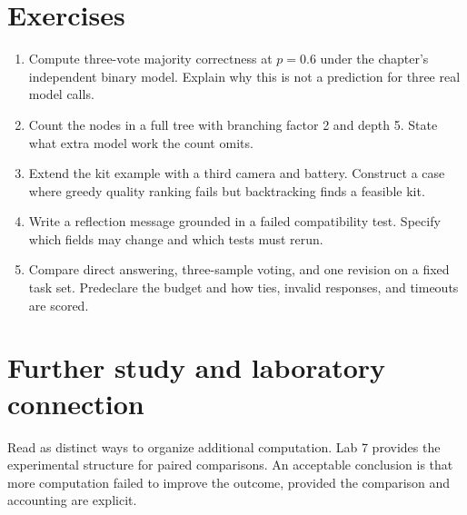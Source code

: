 \section{Exercises}
\begin{enumerate}
\item Compute three-vote majority correctness at \(p=0.6\) under the chapter's independent binary model. Explain why this is not a prediction for three real model calls.
\item Count the nodes in a full tree with branching factor 2 and depth 5. State what extra model work the count omits.
\item Extend the kit example with a third camera and battery. Construct a case where greedy quality ranking fails but backtracking finds a feasible kit.
\item Write a reflection message grounded in a failed compatibility test. Specify which fields may change and which tests must rerun.
\item Compare direct answering, three-sample voting, and one revision on a fixed task set. Predeclare the budget and how ties, invalid responses, and timeouts are scored.
\end{enumerate}

\section{Further study and laboratory connection}
Read \cite{self-consistency,tree-thoughts,reflexion} as distinct ways to organize additional computation. Lab 7 provides the experimental structure for paired comparisons. An acceptable conclusion is that more computation failed to improve the outcome, provided the comparison and accounting are explicit.

